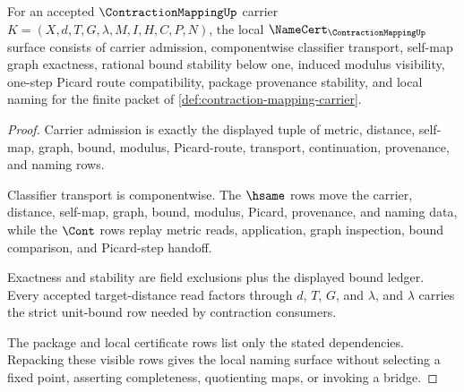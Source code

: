 \begin{theorem}
\label{thm:contraction-mapping-namecert-obligations}
For an accepted $\ContractionMappingUp$ carrier $K=(X,d,T,G,\lambda,M,I,H,C,P,N)$, the local $\NameCert_{\ContractionMappingUp}$ surface consists of carrier admission, componentwise classifier transport, self-map graph exactness, rational bound stability below one, induced modulus visibility, one-step Picard route compatibility, package provenance stability, and local naming for the finite packet of \autoref{def:contraction-mapping-carrier}.
\end{theorem}
\begin{proof}
Carrier admission is exactly the displayed tuple of metric, distance, self-map, graph, bound, modulus, Picard-route, transport, continuation, provenance, and naming rows.

Classifier transport is componentwise. The $\hsame$ rows move the carrier, distance, self-map, graph, bound, modulus, Picard, provenance, and naming data, while the $\Cont$ rows replay metric reads, application, graph inspection, bound comparison, and Picard-step handoff.

Exactness and stability are field exclusions plus the displayed bound ledger. Every accepted target-distance read factors through $d$, $T$, $G$, and $\lambda$, and $\lambda$ carries the strict unit-bound row needed by contraction consumers.

The package and local certificate rows list only the stated dependencies. Repacking these visible rows gives the local naming surface without selecting a fixed point, asserting completeness, quotienting maps, or invoking a bridge.
\end{proof}

